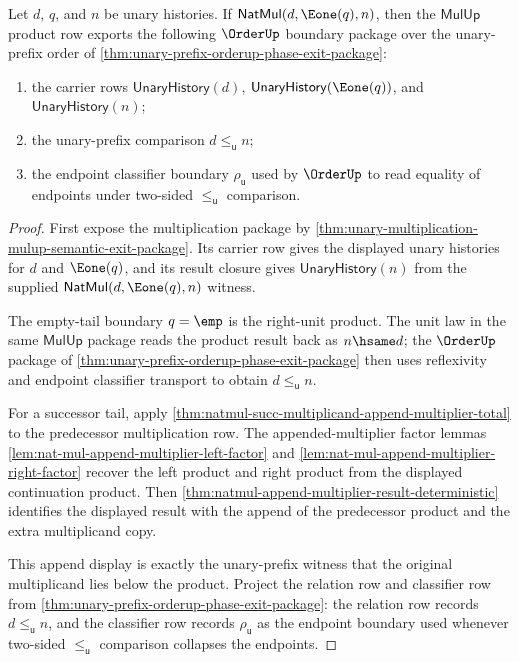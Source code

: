 \begin{theorem}
\label{thm:mulup-unary-product-order-lower-bound-package}
Let $d$, $q$, and $n$ be unary histories. If
$\mathsf{NatMul}(d,\Eone(q),n)$, then the $\mathsf{MulUp}$ product row exports
the following $\OrderUp$ boundary package over the unary-prefix order of
\autoref{thm:unary-prefix-orderup-phase-exit-package}:
\begin{enumerate}
\item the carrier rows $\mathsf{UnaryHistory}(d)$,
$\mathsf{UnaryHistory}(\Eone(q))$, and $\mathsf{UnaryHistory}(n)$;
\item the unary-prefix comparison $d\le_{\mathsf{u}}n$;
\item the endpoint classifier boundary $\rho_{\mathsf{u}}$ used by
$\OrderUp$ to read equality of endpoints under two-sided
$\le_{\mathsf{u}}$ comparison.
\end{enumerate}
\end{theorem}
\begin{proof}
First expose the multiplication package by
\autoref{thm:unary-multiplication-mulup-semantic-exit-package}. Its carrier row
gives the displayed unary histories for $d$ and $\Eone(q)$, and its result
closure gives $\mathsf{UnaryHistory}(n)$ from the supplied
$\mathsf{NatMul}(d,\Eone(q),n)$ witness.

The empty-tail boundary $q=\emp$ is the right-unit product. The unit law in the
same $\mathsf{MulUp}$ package reads the product result back as $n\hsame d$; the
$\OrderUp$ package of \autoref{thm:unary-prefix-orderup-phase-exit-package} then
uses reflexivity and endpoint classifier transport to obtain
$d\le_{\mathsf{u}}n$.

For a successor tail, apply
\autoref{thm:natmul-succ-multiplicand-append-multiplier-total} to the
predecessor multiplication row. The appended-multiplier factor lemmas
\autoref{lem:nat-mul-append-multiplier-left-factor} and
\autoref{lem:nat-mul-append-multiplier-right-factor} recover the left product
and right product from the displayed continuation product. Then
\autoref{thm:natmul-append-multiplier-result-deterministic} identifies the
displayed result with the append of the predecessor product and the extra
multiplicand copy.

This append display is exactly the unary-prefix witness that the original
multiplicand lies below the product. Project the relation row and classifier
row from \autoref{thm:unary-prefix-orderup-phase-exit-package}: the relation
row records $d\le_{\mathsf{u}}n$, and the classifier row records
$\rho_{\mathsf{u}}$ as the endpoint boundary used whenever two-sided
$\le_{\mathsf{u}}$ comparison collapses the endpoints.
\end{proof}

